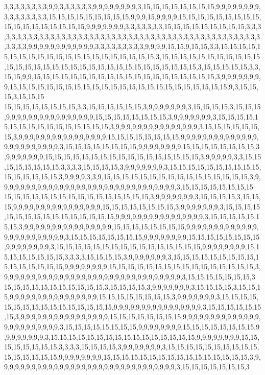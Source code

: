 3,3,3,3,3,3,3,3,9,9,3,3,3,3,3,3,9,9,9,9,9,9,9,9,3,15,15,15,15,15,15,15,15,9,9,9,9,9,9,9,9,3,3,3,3,3,3,3,3,15,15,15,15,15,15,15,15,15,9,9,9,15,9,9,9,9,15,15,15,15,15,15,15,15,15,15,15,15,15,15,15,15,15,15,9,9,9,9,9,9,9,3,3,3,3,3,3,3,15,15,15,15,15,15,15,15,15,3,3,3,3,3,3,3,3,3,3,3,3,3,3,3,3,3,3,3,3,3,3,3,3,3,3,3,3,3,3,3,3,3,3,3,3,3,3,3,3,3,3,3,3,3,3,3,3,3,3,3,3,3,9,9,9,9,9,9,9,9,9,9,9,9,3,3,3,3,3,3,3,3,3,9,9,9,9,15,15,9,15,15,3,3,15,15,15,15,15,15,15,15,15,15,15,15,15,15,15,15,15,15,15,15,15,3,15,15,15,15,15,15,15,15,15,15,15,15,15,15,15,15,15,15,15,15,15,15,15,15,15,15,15,15,15,15,15,15,3,15,15,15,15,15,3,3,15,15,9,9,15,15,15,15,15,15,15,15,15,15,15,15,15,15,15,15,15,15,15,15,3,9,9,9,9,9,9,9,9,15,15,15,15,15,15,15,15,15,15,15,15,15,15,15,15,15,15,15,15,15,15,15,15,9,3,15,15,15,3,15,15,15
15,15,15,15,15,15,15,15,3,3,15,15,15,15,15,15,3,9,9,9,9,9,9,9,3,15,15,15,15,3,15,15,15,9,9,9,9,9,9,9,9,9,9,9,9,9,9,9,9,15,15,15,15,15,15,15,15,3,9,9,9,9,9,9,9,3,15,15,15,15,15,15,15,15,15,15,15,15,15,15,15,15,3,9,9,9,9,9,9,9,9,9,9,9,9,9,9,9,3,15,15,15,15,15,15,15,3,9,9,9,9,9,9,9,9,9,9,9,9,9,9,9,9,15,15,15,15,15,15,15,15,9,9,9,9,9,9,9,9,9,9,9,9,9,9,9,9,9,9,9,9,9,9,9,9,3,15,15,15,15,15,15,15,15,9,9,9,9,9,9,9,9,15,15,15,15,15,15,15,15,3,9,9,9,9,9,9,9,15,15,15,15,15,15,15,15,15,15,15,15,15,15,15,15,15,3,9,9,9,9,9,3,3,15,15,15,15,15,15,15,15,3,3,3,3,15,15,15,15,3,9,9,9,9,9,9,9,3,15,15,15,15,15,15,15,15,15,15,15,15,15,15,15,15,3,9,9,9,9,3,3,9,15,15,15,15,15,15,15,15,15,15,15,15,15,15,15,15,3,9,9,9,9,9,9,9,9,9,9,9,9,9,9,9,9,9,9,9,9,9,9,9,9,9,9,9,9,9,9,9,9,3,15,15,15,15,15,15,15,15
15,15,15,15,15,15,15,15,15,15,15,15,15,15,15,15,3,9,9,9,9,9,9,9,3,15,15,15,15,3,15,15,15,9,9,9,9,9,9,9,9,9,9,9,9,9,9,9,9,15,15,15,15,15,15,15,15,3,9,9,9,9,9,9,9,3,15,15,15,15,15,15,15,15,15,15,15,15,15,15,15,15,9,9,9,9,9,9,9,9,9,9,9,9,9,9,9,9,3,15,15,15,15,15,15,15,3,9,9,9,9,9,9,9,9,9,9,9,9,9,9,9,9,15,15,15,15,15,15,15,15,9,9,9,9,9,9,9,9,9,9,9,9,9,9,9,9,9,9,9,9,9,9,9,9,3,15,15,15,15,15,15,15,15,9,9,9,9,9,9,9,9,15,15,15,15,15,15,15,15,9,9,9,9,9,9,9,9,3,15,15,15,15,15,15,15,15,15,15,15,15,15,15,15,15,9,9,9,9,9,9,9,9,15,15,15,15,15,15,15,15,3,3,3,3,15,15,15,15,3,9,9,9,9,9,9,9,3,15,15,15,15,15,15,15,15,15,15,15,15,15,15,15,15,9,9,9,9,9,9,9,9,15,15,15,15,15,15,15,15,15,15,15,15,15,15,15,15,3,9,9,9,9,9,9,9,9,9,9,9,9,9,9,9,9,9,9,9,9,9,9,9,9,9,9,9,9,9,9,9,9,3,15,15,15,15,15,15,15,3
15,15,15,15,15,15,15,15,15,15,15,3,15,15,15,15,3,9,9,9,9,9,9,9,3,15,15,15,15,3,15,15,15,9,9,9,9,9,9,9,9,9,9,9,9,9,9,9,9,15,15,15,15,15,15,15,15,3,9,9,9,9,9,9,9,3,15,15,15,15,15,15,15,15,15,15,15,15,15,15,15,15,9,9,9,9,9,9,9,9,9,9,9,9,9,9,9,9,3,15,15,15,15,15,15,15,3,9,9,9,9,9,9,9,9,9,9,9,9,9,9,9,9,15,15,15,15,15,15,15,15,9,9,9,9,9,9,9,9,9,9,9,9,9,9,9,9,9,9,9,9,9,9,9,9,3,15,15,15,15,15,15,15,15,9,9,9,9,9,9,9,9,15,15,15,15,15,15,15,15,9,9,9,9,9,9,9,9,3,15,15,15,15,15,15,15,15,15,15,15,15,15,15,15,15,9,9,9,9,9,9,9,9,15,15,15,15,15,15,15,15,3,3,3,3,15,15,15,15,3,9,9,9,9,9,9,9,3,15,15,15,15,15,15,15,15,15,15,15,15,15,15,15,15,9,9,9,9,9,9,9,9,15,15,15,15,15,15,15,15,15,15,15,15,15,15,15,15,3,9,9,9,9,9,9,9,9,9,9,9,9,9,9,9,9,9,9,9,9,9,9,9,9,9,9,9,9,9,9,9,9,3,15,15,15,15,15,15,15,3
